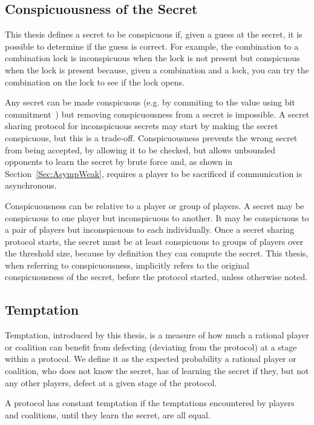 \documentclass[12pt]{dalcsthesis}
\begin{document}
\subsection{Conspicuousness of the Secret} 

This thesis defines a secret to be conspicuous if, given a guess at the secret, it is possible to determine if the guess is correct. For example, the combination to a combination lock is inconspicuous when the lock is not present but conspicuous when the lock is present because, given a combination and a lock, you can try the combination on the lock to see if the lock opens.

Any secret can be made conspicuous (e.g. by commiting to the value using bit commitment~\cite{Damg02, naor91}) but removing conspicuousness from a secret is impossible. A secret sharing protocol for inconspicuous secrets may start by making the secret conspicuous, but this is a trade-off. Conspicuousness prevents the wrong secret from being accepted, by allowing it to be checked, but allows unbounded opponents to learn the secret by brute force and, as shown in Section~\ref{Sec:AsympWeak}, requires a player to be sacrificed if communication is asynchronous.

Conspicuousness can be relative to a player or group of players. A secret may be conspicuous to one player but inconspicuous to another. It may be conspicuous to a pair of players but inconspicuous to each individually. Once a secret sharing protocol starts, the secret must be at least conspicuous to groups of players over the threshold size, because by definition they can compute the secret. This thesis, when referring to conspicuousness, implicitly refers to the original conspicuousness of the secret, before the protocol started, unless otherwise noted.

\subsection{Temptation}

Temptation, introduced by this thesis, is a measure of how much a rational player or coalition can benefit from defecting (deviating from the protocol) at a stage within a protocol. We define it as the expected probability a rational player or coalition, who does not know the secret, has of learning the secret if they, but not any other players, defect at a given stage of the protocol.

A protocol has constant temptation if the temptations encountered by players and coalitions, until they learn the secret, are all equal.
\end{document}
